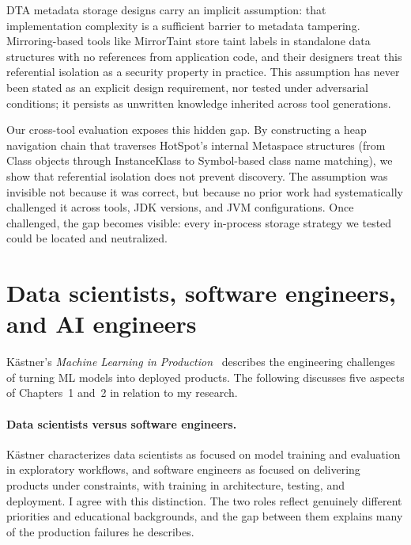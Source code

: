 \documentclass[a4paper,11pt]{article}
\theoremstyle{plain}
\begin{document}
DTA metadata storage designs carry an implicit assumption: that implementation complexity is a sufficient barrier to metadata tampering. Mirroring-based tools like MirrorTaint store taint labels in standalone data structures with no references from application code, and their designers treat this referential isolation as a security property in practice. This assumption has never been stated as an explicit design requirement, nor tested under adversarial conditions; it persists as unwritten knowledge inherited across tool generations.

Our cross-tool evaluation exposes this hidden gap. By constructing a heap navigation chain that traverses HotSpot's internal Metaspace structures (from Class objects through InstanceKlass to Symbol-based class name matching), we show that referential isolation does not prevent discovery. The assumption was invisible not because it was correct, but because no prior work had systematically challenged it across tools, JDK versions, and JVM configurations. Once challenged, the gap becomes visible: every in-process storage strategy we tested could be located and neutralized.



\section{Data scientists, software engineers, and AI engineers}



Kästner's \textit{Machine Learning in Production}~\cite{kaestner2025mlip} describes the engineering challenges of turning ML models into deployed products. The following discusses five aspects of Chapters~1 and~2 in relation to my research.

\paragraph{Data scientists versus software engineers.}
Kästner characterizes data scientists as focused on model training and evaluation in exploratory workflows, and software engineers as focused on delivering products under constraints, with training in architecture, testing, and deployment. I agree with this distinction. The two roles reflect genuinely different priorities and educational backgrounds, and the gap between them explains many of the production failures he describes.
\end{document}
